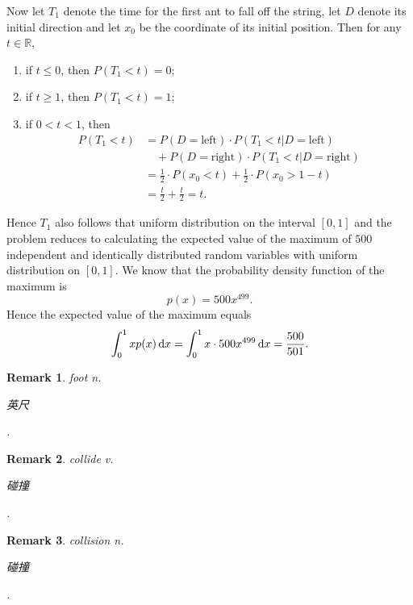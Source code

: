 \documentclass[12pt,letterpaper, onecolumn]{exam}
\newtheorem{remark}{Remark}
\begin{document}
\begin{questions}
\begin{solution}
            \quad Now let $T_1$ denote the time for the first ant to fall off the string, let $D$ denote its initial direction and let $x_0$ be the coordinate of its initial position. Then for any $t\in\mathbb{R}$,
            \begin{enumerate}
                \item if $t\le 0$, then $P(T_1<t)=0$;
                \item if $t\ge 1$, then $P(T_1<t)=1$;
                \item if $0<t<1$, then 
                \begin{align*}
                    P(T_1<t)&=P(D=\text{left})\cdot P(T_1<t|D=\text{left})\\
                    &\quad +P(D=\text{right})\cdot P(T_1<t|D=\text{right})\\
                    &=\frac{1}{2}\cdot P(x_0<t)+\frac{1}{2}\cdot P(x_0>1-t)\\
                    &=\frac{t}{2}+\frac{t}{2}=t.
                \end{align*}
            \end{enumerate}
            Hence $T_1$ also follows that uniform distribution on the interval $[0,1]$ and the problem reduces to calculating the expected value of the maximum of $500$ independent and identically distributed random variables with uniform distribution on $[0,1]$. We know that the probability density function of the maximum is 
            $$p(x)=500x^{499}.$$
            Hence the expected value of the maximum equals
            $$\int_0^1xp(x)\,{\rm{d}}x=\int_0^1x\cdot 500x^{499}\,{\rm{d}}x=\frac{500}{501}.$$
        \end{solution}
        \begin{remark}
            foot n. \begin{CJK}{UTF8}{gbsn}英尺\end{CJK}.
        \end{remark}
        \begin{remark}
            collide  v. \begin{CJK}{UTF8}{gbsn}碰撞\end{CJK}.
        \end{remark}
        \begin{remark}
            collision  n. \begin{CJK}{UTF8}{gbsn}碰撞\end{CJK}.
        \end{remark}
    \end{questions}
\end{document}
